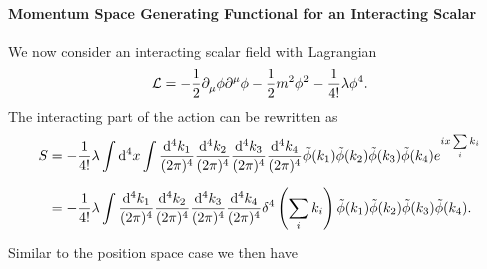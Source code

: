 \paragraph{Momentum Space Generating Functional for an Interacting Scalar}
We now consider an interacting scalar field with Lagrangian
\begin{align*}
	\mathcal{L} = -\frac{1}{2}\partial^{}_{\mu}\phi\partial^{\mu}_{}\phi - \frac{1}{2}m^{2}\phi^{2} - \frac{1}{4!}\lambda\phi^{4}.
\end{align*}
The interacting part of the action can be rewritten as
\begin{align*}
	S &= -\frac{1}{4!}\lambda\int\limits_{}^{}\dd[4]{x}\int\limits_{}^{}\frac{\dd[4]{k_{1}}}{(2\pi)^{4}}\frac{\dd[4]{k_{2}}}{(2\pi)^{4}}\frac{\dd[4]{k_{3}}}{(2\pi)^{4}}\frac{\dd[4]{k_{4}}}{(2\pi)^{4}}\tilde{\phi}(k_{1})\tilde{\phi}(k_{2})\tilde{\phi}(k_{3})\tilde{\phi}(k_{4})e^{ix\sum\limits_{i}k_{i}} \\
	  &= -\frac{1}{4!}\lambda\int\limits_{}^{}\frac{\dd[4]{k_{1}}}{(2\pi)^{4}}\frac{\dd[4]{k_{2}}}{(2\pi)^{4}}\frac{\dd[4]{k_{3}}}{(2\pi)^{4}}\frac{\dd[4]{k_{4}}}{(2\pi)^{4}}\delta^{4}\left(\sum\limits_{i}k_{i}\right)\tilde{\phi}(k_{1})\tilde{\phi}(k_{2})\tilde{\phi}(k_{3})\tilde{\phi}(k_{4}).
\end{align*}
Similar to the position space case we then have
